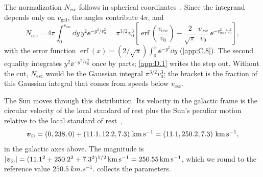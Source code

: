 The normalization $N_{\mathrm{esc}}$ follows in spherical coordinates~\cite[Eq.~(15)]{griffin2018directional}. Since the integrand depends only on $v_{\mathrm{gal}}$, the angles contribute $4\pi$, and
\begin{equation}
  N_{\mathrm{esc}} = 4\pi \int_0^{v_{\mathrm{esc}}} \dd y\, y^2 \ee^{-y^2/v_0^2}
  = \pi^{3/2} v_0^3 \left[\operatorname{erf}\!\left(\frac{v_{\mathrm{esc}}}{v_0}\right) - \frac{2}{\sqrt{\pi}}\,\frac{v_{\mathrm{esc}}}{v_0}\, \ee^{-v_{\mathrm{esc}}^2/v_0^2}\right],
  \label{eq:1.2-nesc}
\end{equation}
with the error function $\operatorname{erf}(x) = (2/\sqrt{\pi})\int_0^x \ee^{-y^2}\dd y$ (\cref{app:C.8}). The second equality integrates $y^2 \ee^{-y^2/v_0^2}$ once by parts; \cref{app:D.1} writes the step out. Without the cut, $N_{\mathrm{esc}}$ would be the Gaussian integral $\pi^{3/2}v_0^3$; the bracket is the fraction of this Gaussian integral that comes from speeds below $v_{\mathrm{esc}}$.

The Sun moves through this distribution. Its velocity in the galactic frame is the circular velocity of the local standard of rest plus the Sun's peculiar motion relative to the local standard of rest~\cite[Table~1 and Eq.~(14)]{baxter2021recommended},
\begin{equation}
  \vect{v}_{\odot} = (0, 238, 0) + (11.1, 12.2, 7.3)\ \si{km.s^{-1}} = (11.1, 250.2, 7.3)\ \si{km.s^{-1}},
  \label{eq:1.2-vsun}
\end{equation}
in the galactic axes above. The magnitude is $|\vect{v}_{\odot}| = (11.1^2 + 250.2^2 + 7.3^2)^{1/2}\,\si{km.s^{-1}} = \SI{250.55}{km.s^{-1}}$, which we round to the reference value $\SI{250.5}{km.s^{-1}}$.  collects the parameters.

